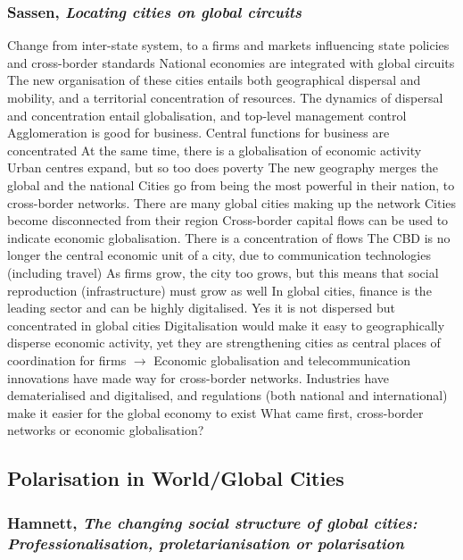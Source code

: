 \documentclass{article}
\begin{document}
\subsubsection{Sassen, \textit{Locating cities on global circuits}}

\begin{outline}
	\1 Change from inter-state system, to a firms and markets influencing state policies and cross-border standards
	\1 National economies are integrated with global circuits
	\1 The new organisation of these cities entails both geographical dispersal and mobility, and a territorial concentration of resources. The dynamics of dispersal and concentration entail globalisation, and top-level management control
		\2 Agglomeration is good for business. Central functions for business are concentrated
		\2 At the same time, there is a globalisation of economic activity
	\1 Urban centres expand, but so too does poverty
	\1 The new geography merges the global and the national
		\2 Cities go from being the most powerful in their nation, to cross-border networks. There are many global cities making up the network
		\2 Cities become disconnected from their region
	\1 Cross-border capital flows can be used to indicate economic globalisation. There is a concentration of flows
	\1 The CBD is no longer the central economic unit of a city, due to communication technologies (including travel)
	\1 As firms grow, the city too grows, but this means that social reproduction (infrastructure) must grow as well
	\1 In global cities, finance is the leading sector and can be highly digitalised. Yes it is not dispersed but concentrated in global cities
		\2 Digitalisation would make it easy to geographically disperse economic activity, yet they are strengthening cities as central places of coordination for firms
	\1 $\rightarrow$ Economic globalisation and telecommunication innovations have made way for cross-border networks. Industries have dematerialised and digitalised, and regulations (both national and international) make it easier for the global economy to exist
		\2 What came first, cross-border networks or economic globalisation?
\end{outline}

\subsection{Polarisation in World/Global Cities}

\subsubsection{Hamnett, \textit{The changing social structure of global cities: Professionalisation, proletarianisation or polarisation}}
\end{document}
